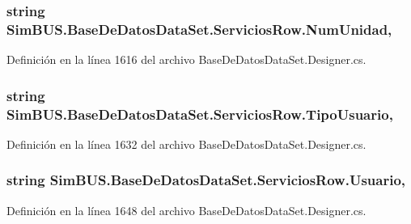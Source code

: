 \subsubsection[{Num\-Unidad}]{\setlength{\rightskip}{0pt plus 5cm}string Sim\-B\-U\-S.\-Base\-De\-Datos\-Data\-Set.\-Servicios\-Row.\-Num\-Unidad\hspace{0.3cm}{\ttfamily [get]}, {\ttfamily [set]}}\label{class_sim_b_u_s_1_1_base_de_datos_data_set_1_1_servicios_row_ad8e5717be004f43b34da40bed4f5a534}


Definición en la línea 1616 del archivo Base\-De\-Datos\-Data\-Set.\-Designer.\-cs.

\subsubsection[{Tipo\-Usuario}]{\setlength{\rightskip}{0pt plus 5cm}string Sim\-B\-U\-S.\-Base\-De\-Datos\-Data\-Set.\-Servicios\-Row.\-Tipo\-Usuario\hspace{0.3cm}{\ttfamily [get]}, {\ttfamily [set]}}\label{class_sim_b_u_s_1_1_base_de_datos_data_set_1_1_servicios_row_a233d8a5aef9e54c57eda26715524e0ee}


Definición en la línea 1632 del archivo Base\-De\-Datos\-Data\-Set.\-Designer.\-cs.

\subsubsection[{Usuario}]{\setlength{\rightskip}{0pt plus 5cm}string Sim\-B\-U\-S.\-Base\-De\-Datos\-Data\-Set.\-Servicios\-Row.\-Usuario\hspace{0.3cm}{\ttfamily [get]}, {\ttfamily [set]}}\label{class_sim_b_u_s_1_1_base_de_datos_data_set_1_1_servicios_row_aa2dca1b6c3828f83f137572eafc0fc98}


Definición en la línea 1648 del archivo Base\-De\-Datos\-Data\-Set.\-Designer.\-cs.

